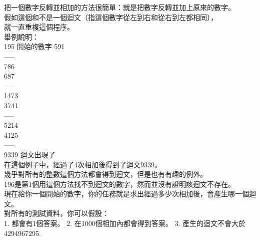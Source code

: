 把一個數字反轉並相加的方法很簡單：就是把數字反轉並加上原來的數字。\\
假如這個和不是一個迴文（指這個數字從左到右和從右到左都相同），\\
就一直重複這個程序。\\
舉例說明：\\
195 開始的數字 591\\
-----\\
786\\
687\\
-----\\
1473\\
3741\\
-----\\
5214\\
4125\\
-----\\
9339 迴文出現了\\
在這個例子中，經過了4次相加後得到了迴文9339。\\
幾乎對所有的整數這個方法都會得到迴文，但是也有有趣的例外。\\
196是第1個用這個方法找不到迴文的數字，然而並沒有證明該迴文不存在。\\
現在給你一個開始的數字，你的任務就是求出經過多少次相加後，會產生哪一個迴文。\\
對所有的測試資料，你可以假設：\\
1. 都會有1個答案。 2. 在1000個相加內都會得到答案。  3. 產生的迴文不會大於4294967295.\\